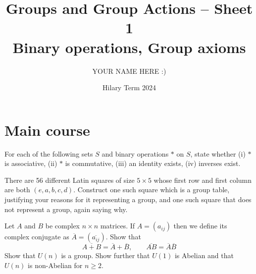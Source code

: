 \documentclass[answers]{exam}
\title{Groups and Group Actions -- Sheet 1\\Binary operations, Group axioms}
\author{YOUR NAME HERE :)}
\date{Hilary Term 2024}
\begin{document}
\maketitle
\section*{Main course}
\begin{questions}

\question%
For each of the following sets $S$ and binary operations $*$ on $S$, state whether (i) $*$ is associative, (ii) $*$ is commutative, (iii) an identity exists, (iv) inverses exist.



\question%
There are 56 different Latin squares of size $5 \times 5$ whose first row and first column are both $(e, a, b, c, d)$. Construct one such square which is a group table, justifying your reasons for it representing a group, and one such square that does not represent a group, again saying why.



\question%
Let $A$ and $B$ be complex $n \times n$ matrices. If $A=\left(a_{i j}\right)$ then we define its complex conjugate as $\overline{A}=(\overline{a_{i j}})$. Show that \[
	\overline{A+B}=\overline{A}+\overline{B}, \qquad \overline{A B}=\overline{A} \overline{B}
\] Show that $U(n)$ is a group. Show further that $U(1)$ is Abelian and that $U(n)$ is non-Abelian for $n \geqslant 2$.




\end{questions}
\end{document}
